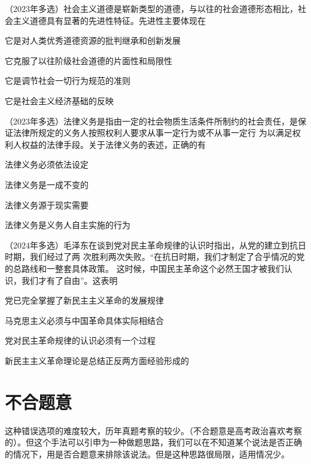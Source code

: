 \documentclass[lang=cn,blue,10pt,scheme=chinese,twocol]{zznote}
\begin{document}
\begin{example} （2023年多选）社会主义道德是崭新类型的道德，与以往的社会道德形态相比，社
	会主义道德具有显著的先进性特征。先进性主要体现在
	\begin{choice}
		\item 它是对人类优秀道德资源的批判继承和创新发展
		\item 它克服了以往阶级社会道德的片面性和局限性
		\item 它是调节社会一切行为规范的准则
		\item 它是社会主义经济基础的反映
	\end{choice}
\end{example}

\begin{example} （2023年多选）法律义务是指由一定的社会物质生活条件所制约的社会责任，是保 证法律所规定的义务人按照权利人要求从事一定行为或不从事一定行
	为以满足权利人权益的法律手段。关于法律义务的表述，正确的有

	\begin{choice}
		\item 法律义务必须依法设定
		\item 法律义务是一成不变的
		\item 法律义务源于现实需要
		\item 法律义务是义务人自主实施的行为
	\end{choice}
\end{example}

\begin{example} （2024年多选）毛泽东在谈到党对民主革命规律的认识时指出，从党的建立到抗日时期，我们经过了两 次胜利两次失败。“在抗日时期，我们才制定了合乎情况的党的总路线和一整套具体政策。 这时候，中国民主革命这个必然王国才被我们认识，我们才有了自由”。这表明
	\begin{choice}
		\item 党已完全掌握了新民主主义革命的发展规律
		\item 马克思主义必须与中国革命具体实际相结合
		\item 党对民主革命规律的认识必须有一个过程
		\item 新民主主义革命理论是总结正反两方面经验形成的
	\end{choice}
\end{example}


\section{不合题意}
\begin{definition}
	这种错误选项的难度较大，历年真题考察的较少。（不合题意是高考政治喜欢考察的）。但这个手法可以引申为一种做题思路，我们可以在不知道某个说法是否正确的情况下，用是否合题意来排除该说法。但是这种思路很局限，适用情况少。
\end{definition}
\end{document}
